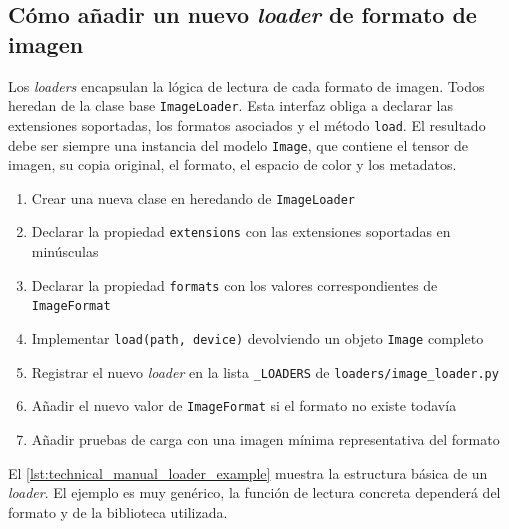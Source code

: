 \newpage

\subsection{Cómo añadir un nuevo \textit{loader} de formato de imagen}

Los \textit{loaders} encapsulan la lógica de lectura de cada formato de imagen.
Todos heredan de la clase base \texttt{ImageLoader}. Esta interfaz obliga a declarar
las extensiones soportadas, los formatos asociados y el método \texttt{load}. El
resultado debe ser siempre una instancia del modelo \texttt{Image}, que contiene el
tensor de imagen, su copia original, el formato, el espacio de color y los metadatos.


\begin{enumerate}[noitemsep]
    \item Crear una nueva clase en  heredando de \texttt{ImageLoader}
    \item Declarar la propiedad \texttt{extensions} con las extensiones soportadas en minúsculas
    \item Declarar la propiedad \texttt{formats} con los valores correspondientes de \texttt{ImageFormat}
    \item Implementar \texttt{load(path, device)} devolviendo un objeto \texttt{Image} completo
    \item Registrar el nuevo \textit{loader} en la lista \texttt{\_LOADERS} de \texttt{loaders/image\_loader.py}
    \item Añadir el nuevo valor de \texttt{ImageFormat} si el formato no existe todavía
    \item Añadir pruebas de carga con una imagen mínima representativa del formato
\end{enumerate}

\newpage

El \autoref{lst:technical_manual_loader_example} muestra la estructura básica de
un \textit{loader}. El ejemplo es muy genérico, la función de lectura
concreta dependerá del formato y de la biblioteca utilizada.


